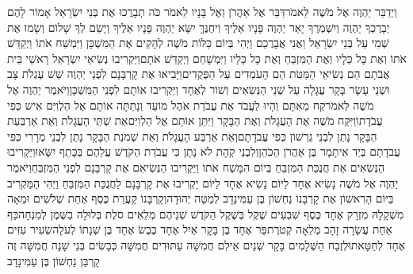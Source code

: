 \documentclass[../main/main.tex]{subfiles}
\begin{document}
\begin{multicols*}{\ncols}
וַיְדַבֵּר יַהְוֶה אֶל מֹשֶׁה לֵּאמֹר\PreVerseSpace{}דַּבֵּר אֶל אַהֲרֹן וְאֶל בָּנָיו לֵאמֹר כֹּה תְבָרֲכוּ אֶת בְּנֵי יִשְׂרָאֵל אָמוֹר לָהֶם \ClosedSection{}יְבָרֶכְךָ יַהְוֶה וְיִשְׁמְרֶךָ \ClosedSection{}יָאֵר יַהְוֶה פָּנָיו אֵלֶיךָ וִיחֻנֶּךָּ \ClosedSection{}יִשָּׂא יַהְוֶה פָּנָיו אֵלֶיךָ וְיָשֵׂם לְךָ שָׁלוֹם \ClosedSection{}וְשָׂמוּ אֶת שְׁמִי עַל בְּנֵי יִשְׂרָאֵל וַאֲנִי אֲבָרֲכֵם \ClosedSection{}וַיְהִי בְּיוֹם כַּלּוֹת מֹשֶׁה לְהָקִים אֶת הַמִּשְׁכָּן וַיִּמְשַׁח אֹתוֹ וַיְקַדֵּשׁ אֹתוֹ וְאֶת כָּל כֵּלָיו וְאֶת הַמִּזְבֵּחַ וְאֶת כָּל כֵּלָיו וַיִּמְשָׁחֵם וַיְקַדֵּשׁ אֹתָם\PreVerseSpace{}וַיַּקְרִיבוּ נְשִׂיאֵי יִשְׂרָאֵל רָאשֵׁי בֵּית אֲבֹתָם הֵם נְשִׂיאֵי הַמַּטֹּת הֵם הָעֹמְדִים עַל הַפְּקֻדִים\PreVerseSpace{}וַיָּבִיאוּ אֶת קָרְבָּנָם לִפְנֵי יַהְוֶה שֵׁשׁ עֶגְלֹת צָב וּשְׁנֵי עָשָׂר בָּקָר עֲגָלָה עַל שְׁנֵי הַנְּשִׂאִים וְשׁוֹר לְאֶחָד וַיַּקְרִיבוּ אוֹתָם לִפְנֵי הַמִּשְׁכָּן\PreVerseSpace{}וַיֹּאמֶר יַהְוֶה אֶל מֹשֶׁה לֵּאמֹר\PreVerseSpace{}קַח מֵאִתָּם וְהָיוּ לַעֲבֹד אֶת עֲבֹדַת אֹהֶל מוֹעֵד וְנָתַתָּה אוֹתָם אֶל הַלְוִיִּם אִישׁ כְּפִי עֲבֹדָתוֹ\PreVerseSpace{}וַיִּקַּח מֹשֶׁה אֶת הָעֲגָלֹת וְאֶת הַבָּקָר וַיִּתֵּן אוֹתָם אֶל הַלְוִיִּם\PreVerseSpace{}אֵת שְׁתֵּי הָעֲגָלֹת וְאֵת אַרְבַּעַת הַבָּקָר נָתַן לִבְנֵי גֵרְשׁוֹן כְּפִי עֲבֹדָתָם\PreVerseSpace{}וְאֵת אַרְבַּע הָעֲגָלֹת וְאֵת שְׁמֹנַת הַבָּקָר נָתַן לִבְנֵי מְרָרִי כְּפִי עֲבֹדָתָם בְּיַד אִיתָמָר בֶּן אַהֲרֹן הַכֹּהֵן\PreVerseSpace{}וְלִבְנֵי קְהָת לֹא נָתָן כִּי עֲבֹדַת הַקֹּדֶשׁ עֲלֵהֶם בַּכָּתֵף יִשָּׂאוּ\PreVerseSpace{}וַיַּקְרִיבוּ הַנְּשִׂאִים אֵת חֲנֻכַּת הַמִּזְבֵּחַ בְּיוֹם הִמָּשַׁח אֹתוֹ וַיַּקְרִיבוּ הַנְּשִׂיאִם אֶת קָרְבָּנָם לִפְנֵי הַמִּזְבֵּחַ\PreVerseSpace{}וַיֹּאמֶר יַהְוֶה אֶל מֹשֶׁה נָשִׂיא אֶחָד לַיּוֹם נָשִׂיא אֶחָד לַיּוֹם יַקְרִיבוּ אֶת קָרְבָּנָם לַחֲנֻכַּת הַמִּזְבֵּחַ \ClosedSection{}וַיְהִי הַמַּקְרִיב בַּיּוֹם הָרִאשׁוֹן אֶת קָרְבָּנוֹ נַחְשׁוֹן בֶּן עַמִּינָדָב לְמַטֵּה יְהוּדָה\PreVerseSpace{}וְקָרְבָּנוֹ קַעֲרַת כֶּסֶף אַחַת שְׁלֹשִׁים וּמֵאָה מִשְׁקָלָהּ מִזְרָק אֶחָד כֶּסֶף שִׁבְעִים שֶׁקֶל בְּשֶׁקֶל הַקֹּדֶשׁ שְׁנֵיהֶם מְלֵאִים סֹלֶת בְּלוּלָה בַשֶּׁמֶן לְמִנְחָה\PreVerseSpace{}כַּף אַחַת עֲשָׂרָה זָהָב מְלֵאָה קְטֹרֶת\PreVerseSpace{}פַּר אֶחָד בֶּן בָּקָר אַיִל אֶחָד כֶּבֶשׂ אֶחָד בֶּן שְׁנָתוֹ לְעֹלָה\PreVerseSpace{}שְׂעִיר עִזִּים אֶחָד לְחַטָּאת\PreVerseSpace{}וּלְזֶבַח הַשְּׁלָמִים בָּקָר שְׁנַיִם אֵילִם חֲמִשָּׁה עַתּוּדִים חֲמִשָּׁה כְּבָשִׂים בְּנֵי שָׁנָה חֲמִשָּׁה זֶה קָרְבַּן נַחְשׁוֹן בֶּן עַמִּינָדָב\OpenSection{}\par

\end{multicols*}
\end{document}
